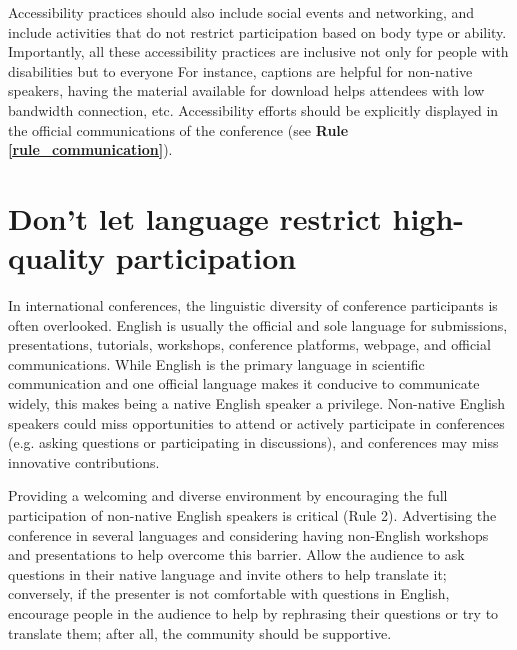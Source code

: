 \documentclass[10pt,letterpaper]{article}
\begin{document}
Accessibility practices should also include social events and networking, and include activities that do not restrict participation based on body type or ability. Importantly, all these accessibility practices are inclusive not only for people with disabilities but to everyone %
For instance, captions are helpful for non-native speakers, having the material available for download helps attendees with low bandwidth connection, etc. Accessibility efforts should be explicitly displayed in the official communications of the conference (see \textbf{Rule \ref{rule_communication}}). 




\section{Don't let language restrict high-quality participation}
\label{rule_language}

In international conferences, the linguistic diversity of conference participants is often overlooked. 
English is usually the official and sole language for submissions, presentations, tutorials, workshops, conference platforms, webpage, and official communications. 
While English is the primary language in scientific communication and one official language makes it conducive to communicate widely, this makes being a native English speaker a privilege.
Non-native English speakers could miss opportunities to attend or actively participate in conferences (e.g. asking questions or participating in discussions),
and conferences may miss innovative contributions.

Providing a welcoming and diverse environment by encouraging the full participation of non-native English speakers is critical (Rule 2). 
Advertising the conference in several languages and considering having non-English workshops and presentations to help overcome this barrier. 
Allow the audience to ask questions in their native language and invite others to help translate it; conversely, if the presenter is not comfortable with questions in English, encourage people in the audience to help by rephrasing their questions or try to translate them; after all, the community should be supportive. 

\end{document}
